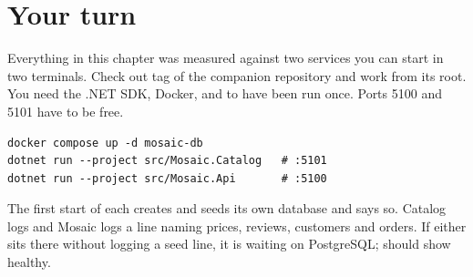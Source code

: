 \section*{Your turn}

Everything in this chapter was measured against two services you can start in
two terminals. Check out tag  of the companion repository and work
from its root. You need the .NET SDK, Docker, and  to have been run
once. Ports 5100 and 5101 have to be free.

\begin{verbatim}
docker compose up -d mosaic-db
dotnet run --project src/Mosaic.Catalog   # :5101
dotnet run --project src/Mosaic.Api       # :5100
\end{verbatim}

The first start of each creates and seeds its own database and says so.
Catalog logs  and Mosaic
logs a line naming prices, reviews, customers and orders. If either sits there
without logging a seed line, it is waiting on PostgreSQL;  should show  healthy.

